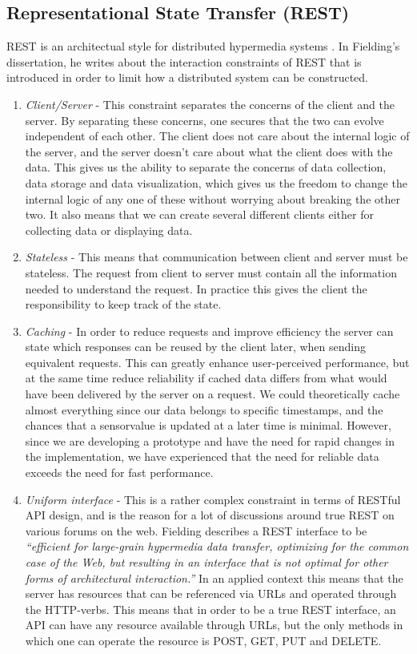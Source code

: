 \subsection{Representational State Transfer (REST)}
REST is an architectual style for distributed hypermedia systems \citep{fielding2000architectural}. In Fielding's dissertation, he writes about the interaction constraints of REST that is introduced in order to limit how a distributed system can be constructed. 

\begin{enumerate}
\item{} \emph{Client/Server} - This constraint separates the concerns of the client and the server. By separating these concerns, one secures that the two can evolve independent of each other. The client does not care about the internal logic of the server, and the server doesn't care about what the client does with the data. This gives us the ability to separate the concerns of data collection, data storage and data visualization, which gives us the freedom to change the internal logic of any one of these without worrying about breaking the other two. It also means that we can create several different clients either for collecting data or displaying data.

\item{} \emph{Stateless} - This means that communication between client and server must be stateless. The request from client to server must contain all the information needed to understand the request. In practice this gives the client the responsibility to keep track of the state.

\item{} \emph{Caching} - In order to reduce requests and improve efficiency the server can state which responses can be reused by the client later, when sending equivalent requests. This can greatly enhance user-perceived performance, but at the same time reduce reliability if cached data differs from what would have been delivered by the server on a request. We could theoretically cache almost everything since our data belongs to specific timestamps, and the chances that a sensorvalue is updated at a later time is minimal. However, since we are developing a prototype and have the need for rapid changes in the implementation, we have experienced that the need for reliable data exceeds the need for fast performance.

\item{} \emph{Uniform interface} - This is a rather complex constraint in terms of RESTful API design, and is the reason for a lot of discussions around true REST on various forums on the web. Fielding describes a REST interface to be \emph{“efficient for large-grain hypermedia data transfer, optimizing for the common case of the Web, but resulting in an interface that is not optimal for other forms of architectural interaction.”} \citep{fielding2000architectural} In an applied context this means that the server has resources that can be referenced via URLs and operated through the HTTP-verbs. This means that in order to be a true REST interface, an API can have any resource available through URLs, but the only methods in which one can operate the resource is POST, GET, PUT and DELETE.


\end{enumerate}
